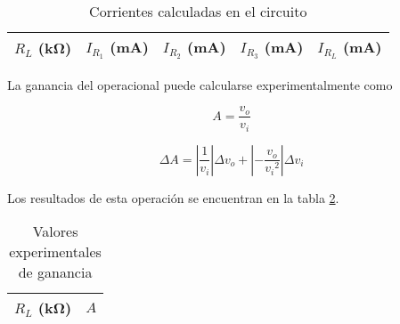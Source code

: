 \begin{table}[H]
    \centering
    \begin{tabular}{@{}rrrrr@{}}
        \toprule
        $R_L$ (\si{\kilo\ohm}) & $I_{R_1}$ (\si{\milli\ampere}) & $I_{R_2}$ (\si{\milli\ampere}) & $I_{R_3}$ (\si{\milli\ampere}) & $I_{R_L}$ (\si{\milli\ampere}) \\
        \midrule
        
    \end{tabular}
    \caption{Corrientes calculadas en el circuito}
    \label{tab:1-datos:corrientes}
\end{table}

La ganancia del operacional puede calcularse experimentalmente como

\begin{equation}
    \label{ec:1-teoria:ganancia-experimental}
    A = \frac{v_o}{v_i}
\end{equation}

\begin{equation}
    \label{ec:1-teoria:err-ganancia-experimental}
    \Delta A = \left| \frac{1}{v_i} \right| \Delta v_o + \left| -\frac{v_o}{{v_i}^2} \right| \Delta v_i
\end{equation}

Los resultados de esta operación se encuentran en la tabla \ref{tab:1-teoria:ganancia-experimental}.


\begin{table}[H]
    \centering
    \begin{tabular}{@{}rr@{}}
        \toprule
        $R_L$ (\si{\kilo\ohm}) & $A$ \\
        \midrule
        
    \end{tabular}
    \caption{Valores experimentales de ganancia}
    \label{tab:1-teoria:ganancia-experimental}
\end{table}
